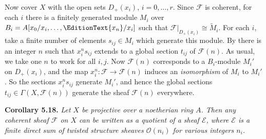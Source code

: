 {Now cover $X$ with the open sets $D_+(x_i)$, $i=0,\ldots,r$. Since $\mathcal F$ is coherent, for each $i$ there is a finitely generated module $M_i$ over $B_i=A[x_0/x_i,\ldots,\EditionText{x_n}/x_i]$ such that $\mathcal F|_{D_+(x_i)}\cong\widetilde M_i$. For each $i$, take a finite number of elements $s_{ij}\in M_i$ which generate this module. By  there is an integer $n$ such that $x_i^ns_{ij}$ extends to a global section $t_{ij}$ of $\mathcal F(n)$. As usual, we take one $n$ to work for all $i,j$. Now $\mathcal F(n)$ corresponds to a $B_i$-module $M_i'$ on $D_+(x_i)$, and the map $x_i^n\colon\mathcal F\to\mathcal F(n)$ induces an \emph{isomorphism} of $M_i$ to $M_i'$. So the sections $x_i^ns_{ij}$ generate $M_i'$, and hence the global sections $t_{ij}\in\Gamma(X,\mathcal F(n))$ generate the sheaf $\mathcal F(n)$ everywhere.

\medskip
\noindent\hypertarget{result-II-5.18}{}\textbf{Corollary 5.18.} \emph{Let $X$ be projective over a noetherian ring $A$. Then any coherent sheaf $\mathcal F$ on $X$ can be written as a quotient of a sheaf $\mathcal E$, where $\mathcal E$ is a finite direct sum of twisted structure sheaves $\mathcal O(n_i)$ for various integers $n_i$.}
}
